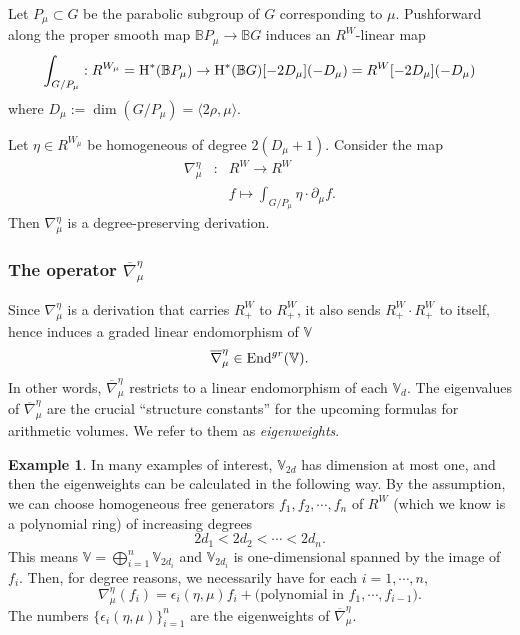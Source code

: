 \documentclass[reqno]{amsart}
\numberwithin{equation}{subsection}
\theoremstyle{definition}
\newtheorem{exam}[subsubsection]{Example}
\def\BB{\mathbb{B}}
\def\VV{\mathbb{V}}
\newcommand\End{\textup{End}}
\newcommand{\ov}{\overline}
\newcommand{\cohog}[2]{\textup{H}^{#1}({#2})}     %
\newcommand\mt{\mapsto}
\newcommand{\e}{\epsilon}
\newcommand{\y}{\eta}
\newcommand\nb{\nabla}
\newcommand\pl{\partial}
\newcommand{\tw}[1]{\langle #1 \rangle}
\begin{document}
Let $P_\mu \subset G$ be the parabolic subgroup of $G$ corresponding to $\mu$. Pushforward along the proper smooth map $\BB P_\mu \rightarrow \BB G$ induces an $R^{W}$-linear map
\begin{equation}\label{eq:integration-map}
\int_{G/P_{\mu}}: R^{W_{\mu}}=\cohog{*}{\BB P_\mu} \to \cohog{*}{\BB G}[-2D_\mu](-D_\mu)=R^{W}[-2D_\mu](-D_\mu)
\end{equation}
where $D_\mu := \dim (G/P_{\mu}) = \tw{2\rho, \mu}$. 

Let $\y\in R^{W_{\mu}}$ be homogeneous of degree $2(D_\mu+1)$. Consider the map
\begin{eqnarray}\label{eq: nabla lambda eta}
\nb^{\y}_{\mu}&:& R^{W}\to R^{W}\\
&& f\mt \int_{G/P_{\mu}} \y \cdot \pl_{\mu}f.
\end{eqnarray}
Then $\nb^{\y}_{\mu}$ is a degree-preserving derivation.



\subsubsection{The operator $\ov\nb^{\y}_{\mu}$}\label{sssec:ov-nabla}

Since $\nb^{\y}_{\mu}$ is a derivation that carries $R^{W}_{+}$ to $R^{W}_{+}$, it also sends $R^{W}_{+}\cdot R^{W}_{+}$ to itself, hence induces a graded linear endomorphism of $\VV$
\begin{equation*}
\ov\nb^{\y}_{\mu}\in \End^{gr}(\VV).
\end{equation*}
In other words, $\ov\nb^{\y}_{\mu}$ restricts to a linear endomorphism of each $\VV_{d}$. The eigenvalues of $\ov\nb^{\y}_{\mu}$ are the crucial ``structure constants'' for the upcoming formulas for arithmetic volumes. We refer to them as \emph{eigenweights}. 

\begin{exam}\label{exam:eps}
In many examples of interest, $\VV_{2d}$ has dimension at most one, and then the eigenweights can be calculated in the following way. By the assumption, we can choose homogeneous free generators $f_{1},f_{2},\cdots, f_{n}$ of $R^{W}$ (which we know is a polynomial ring) of increasing degrees
\begin{equation*}
2d_{1}< 2d_{2}<\cdots < 2d_{n}.
\end{equation*}
This means $\VV=\bigoplus_{i=1}^{n}\VV_{2d_{i}}$ and $\VV_{2d_{i}}$ is one-dimensional spanned by the image of $f_{i}$. Then, for degree reasons, we necessarily have for each $i=1,\cdots, n$,
\begin{equation*}
\nb_{\mu}^{\y} (f_{i})=\e_{i}(\eta, \mu) f_{i}+\mbox{(polynomial in $f_{1},\cdots, f_{i-1}$)}.
\end{equation*}
The numbers $\{\e_{i}(\eta, \mu)\}_{i=1}^n$ are the eigenweights of $\ov\nb^{\y}_{\mu}$.
\end{exam}
\end{document}

